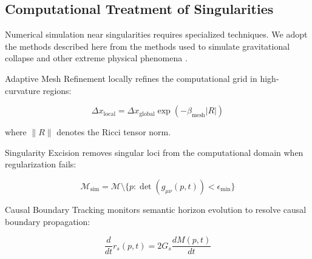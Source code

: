 
\subsection{Computational Treatment of Singularities}
\label{12.2.3:computational_treatment_of_singularities}

Numerical simulation near singularities requires specialized techniques. We adopt the methods described here from the methods used to simulate gravitational collapse and other extreme physical phenomena \autocite{BaumgarteShapiro2010}.

Adaptive Mesh Refinement locally refines the computational grid in high-curvature regions:

\begin{equation}
\Delta x_{\text{local}} = \Delta x_{\text{global}} \exp(-\beta_{\text{mesh}} |R|)
\end{equation}

where \(\|R\|\) denotes the Ricci tensor norm.

Singularity Excision removes singular loci from the computational domain when regularization fails:

\begin{equation}
\mathcal{M}_{\text{sim}} = \mathcal{M} \setminus \{p : \det(g_{\mu\nu}(p, t)) < \epsilon_{\text{min}}\}
\end{equation}

Causal Boundary Tracking monitors semantic horizon evolution to resolve causal boundary propagation:

\begin{equation}
\frac{d}{dt} r_s(p, t) = 2G_s \frac{dM(p, t)}{dt}
\end{equation}